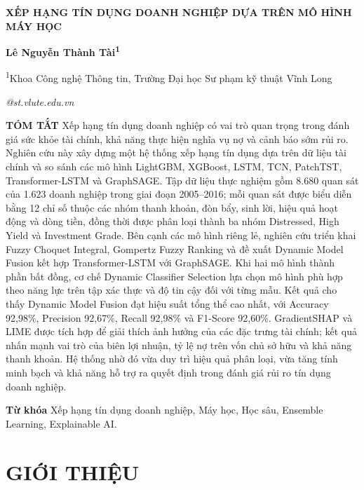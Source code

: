 \documentclass[10pt,twoside]{article}
\makeatletter
\newcommand{\arialfont}{\fontfamily{phv}\selectfont}
\newcommand{\PaperTitle}{XẾP HẠNG TÍN DỤNG DOANH NGHIỆP DỰA TRÊN MÔ HÌNH MÁY HỌC}
\newcommand{\PaperAuthors}{Lê Nguyễn Thành Tài\textsuperscript{1}}
\newcommand{\PaperAffiliations}{%
\textsuperscript{1}Khoa Công nghệ Thông tin, Trường Đại học Sư phạm kỹ thuật Vĩnh Long
}
\newcommand{\PaperEmail}{22022001@st.vlute.edu.vn}
\newcommand{\makefairtitle}{%
\thispagestyle{firstpage}%
\begin{center}
{\arialfont\bfseries\fontsize{14pt}{16pt}\selectfont\MakeUppercase{\PaperTitle}\par}
\vspace{3pt}
{\bfseries\normalsize\PaperAuthors\par}
\vspace{3pt}
{\fontsize{9pt}{11pt}\selectfont\PaperAffiliations\par}
\vspace{3pt}
{\itshape\fontsize{9pt}{11pt}\selectfont\PaperEmail\par}
\end{center}
\vspace{6pt}%
}
\newcommand{\FairDash}{\unskip\textemdash\space}
\newenvironment{fairabstract}{%
\begingroup
\fontsize{9pt}{11pt}\selectfont
\itshape
\setlength{\parindent}{1cm}%
\setlength{\parskip}{6pt}%
}{%
\par\endgroup
}
\newcommand{\fairabstracttext}[1]{%
\begin{fairabstract}
\textbf{TÓM TẮT}\FairDash #1
\end{fairabstract}
}
\newcommand{\fairkeywords}[1]{%
\begin{fairabstract}
\textbf{Từ khóa}\FairDash #1
\end{fairabstract}
}
\makeatother
\begin{document}
\makefairtitle

\fairabstracttext{%
Xếp hạng tín dụng doanh nghiệp có vai trò quan trọng trong đánh giá sức khỏe tài chính, khả năng thực hiện nghĩa vụ nợ và cảnh báo sớm rủi ro. Nghiên cứu này xây dựng một hệ thống xếp hạng tín dụng dựa trên dữ liệu tài chính và so sánh các mô hình LightGBM, XGBoost, LSTM, TCN, PatchTST, Transformer-LSTM và GraphSAGE. Tập dữ liệu thực nghiệm gồm 8.680 quan sát của 1.623 doanh nghiệp trong giai đoạn 2005--2016; mỗi quan sát được biểu diễn bằng 12 chỉ số thuộc các nhóm thanh khoản, đòn bẩy, sinh lời, hiệu quả hoạt động và dòng tiền, đồng thời được phân loại thành ba nhóm Distressed, High Yield và Investment Grade. Bên cạnh các mô hình riêng lẻ, nghiên cứu triển khai Fuzzy Choquet Integral, Gompertz Fuzzy Ranking và đề xuất Dynamic Model Fusion kết hợp Transformer-LSTM với GraphSAGE. Khi hai mô hình thành phần bất đồng, cơ chế Dynamic Classifier Selection lựa chọn mô hình phù hợp theo năng lực trên tập xác thực và độ tin cậy đối với từng mẫu. Kết quả cho thấy Dynamic Model Fusion đạt hiệu suất tổng thể cao nhất, với Accuracy 92,98\%, Precision 92,67\%, Recall 92,98\% và F1-Score 92,60\%. GradientSHAP và LIME được tích hợp để giải thích ảnh hưởng của các đặc trưng tài chính; kết quả nhấn mạnh vai trò của biên lợi nhuận, tỷ lệ nợ trên vốn chủ sở hữu và khả năng thanh khoản. Hệ thống nhờ đó vừa duy trì hiệu quả phân loại, vừa tăng tính minh bạch và khả năng hỗ trợ ra quyết định trong đánh giá rủi ro tín dụng doanh nghiệp.
}

\fairkeywords{%
Xếp hạng tín dụng doanh nghiệp, Máy học, Học sâu, Ensemble Learning, Explainable AI.
}

\section{GIỚI THIỆU}
\end{document}
